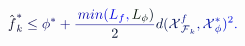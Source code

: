 \documentclass[12pt]{article}
\begin{document}
\makeatletter
\renewcommand*{\@textcolor}[3]{%
  \protect\leavevmode
  \begingroup
    \color#1{#2}#3%
  \endgroup
}
\makeatother
\begin{displaymath}
{\mathcolor[RGB]{0,0,15}{\hat { \mathcolor[RGB]{0,0,30}{f} } }} _ { \mathcolor[RGB]{0,0,45}{k} } ^ { \mathcolor[RGB]{0,0,60}{*} } \mathcolor[RGB]{0,0,75}{\leq} \mathcolor[RGB]{0,0,90}{\phi} ^ { \mathcolor[RGB]{0,0,105}{*} } \mathcolor[RGB]{0,0,120}{+} \mathcolor[RGB]{0,0,135}{\frac { \mathcolor[RGB]{0,0,150}{\operatorname*} { \mathcolor[RGB]{0,0,165}{m} \mathcolor[RGB]{0,0,180}{i} \mathcolor[RGB]{0,0,195}{n} } \mathcolor[RGB]{0,0,210}{(} \mathcolor[RGB]{0,0,225}{L} _ { \mathcolor[RGB]{0,0,240}{f} } \mathcolor[RGB]{0,0,255}{,} \mathcolor[RGB]{0,15,0}{L} _ { \mathcolor[RGB]{0,15,15}{\phi} } \mathcolor[RGB]{0,15,30}{)} } { \mathcolor[RGB]{0,15,45}{2} } } \mathcolor[RGB]{0,15,60}{d} \mathcolor[RGB]{0,15,75}{(} \mathcal { \mathcolor[RGB]{0,15,90}{X} } _ { \mathcal { \mathcolor[RGB]{0,15,105}{F} } _ { \mathcolor[RGB]{0,15,120}{k} } } ^ { \mathcolor[RGB]{0,15,135}{f} } \mathcolor[RGB]{0,15,150}{,} \mathcal { \mathcolor[RGB]{0,15,165}{X} } _ { \mathcolor[RGB]{0,15,180}{\phi} } ^ { \mathcolor[RGB]{0,15,195}{*} } \mathcolor[RGB]{0,15,210}{)} ^ { \mathcolor[RGB]{0,15,225}{2} } \mathcolor[RGB]{0,15,240}{.}
\end{displaymath}
\end{document}
